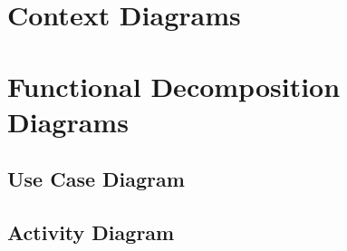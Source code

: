 \documentclass[12pt,letterpaper]{article}
\begin{document}
\section{Context Diagrams}

\section{Functional Decomposition Diagrams}

\subsection{Use Case Diagram}

\subsection{Activity Diagram}
\end{document}
